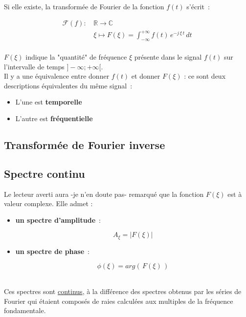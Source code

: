 Si elle existe, la transformée de Fourier de la fonction $f(t)$ s'écrit~:

\begin{equation}
	\begin{split}
		\mathcal{F}(f): \, & \mathbb{R} \rightarrow  \mathbb{C}  \\	
		& \xi \mapsto F(\xi)=\int_{-\infty}^{+\infty}f(t)\,e^{-j\,\xi\,t}\,dt \\
	\end{split}
\end{equation}

$F(\xi)$ indique la "quantité" de fréquence $\xi$ présente dans le signal $f(t)$ sur l'intervalle de temps $]-\infty;+\infty[$. \\

Il y a une équivalence entre donner $f(t)$ et donner $F(\xi)$ : ce sont deux descriptions équivalentes du même signal~:\\

\begin{itemize}

	\item L'une est \textbf{temporelle} \\

	\item L'autre est \textbf{fréquentielle} 

\end{itemize}

\subsection*{Transformée de Fourier inverse }


\subsection*{Spectre continu}

Le lecteur averti aura -je n'en doute pas- remarqué que la fonction $F(\xi)$ est à valeur complexe. Elle admet : \\

\begin{itemize}
	\item \textbf{un spectre d'amplitude}~:  

		$$A_\xi = \lvert F(\xi) \rvert $$ 

	\item \textbf{un spectre de phase}~: 

		$$\phi(\xi) = arg(\,F(\xi)\,)$$ \\

\end{itemize}

Ces spectres sont \underline{continus}, à la différence des spectres obtenus par les séries de Fourier qui étaient composés de raies calculées aux multiples de la fréquence fondamentale.


